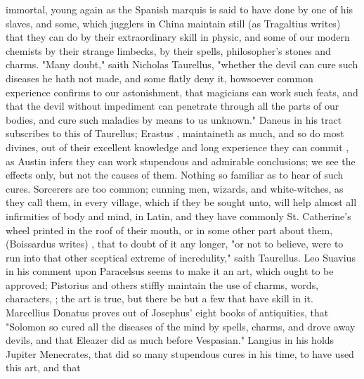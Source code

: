{immortal, young again as the Spanish marquis is said to
have done by one of his slaves, and some, which jugglers in
China maintain still (as Tragaltius writes) that they can
do by their extraordinary skill in physic, and some of our modern chemists by
their strange limbecks, by their spells, philosopher's stones and charms.
"Many doubt," saith Nicholas Taurellus, "whether the devil
can cure such diseases he hath not made, and some flatly deny it, howsoever
common experience confirms to our astonishment, that magicians can work such
feats, and that the devil without impediment can penetrate through all the
parts of our bodies, and cure such maladies by means to us unknown." Daneus in
his tract  subscribes to this of Taurellus;
Erastus , maintaineth as much, and so do most
divines, out of their excellent knowledge and long experience they can commit
, as Austin infers  they can work stupendous and admirable
conclusions; we see the effects only, but not the causes of them. Nothing so
familiar as to hear of such cures. Sorcerers are too common; cunning men,
wizards, and white-witches, as they call them, in every village, which if they
be sought unto, will help almost all infirmities of body and mind,
 in Latin, and they have commonly St. Catherine's wheel printed
in the roof of their mouth, or in some other part about them,  (Boissardus writes)  \etc{}, that to doubt of it any longer,
"or not to believe, were to run into that other sceptical
extreme of incredulity," saith Taurellus. Leo Suavius in his comment upon
Paracelsus seems to make it an art, which ought to be approved; Pistorius and
others stiffly maintain the use of charms, words, characters, \etc{} ; the art is true, but there be but a
few that have skill in it. Marcellius Donatus  proves out of Josephus' eight books of antiquities, that
"Solomon so cured all the diseases of the mind by spells,
charms, and drove away devils, and that Eleazer did as much before Vespasian."
Langius in his  holds Jupiter Menecrates,
that did so many stupendous cures in his time, to have used this art, and that
}
